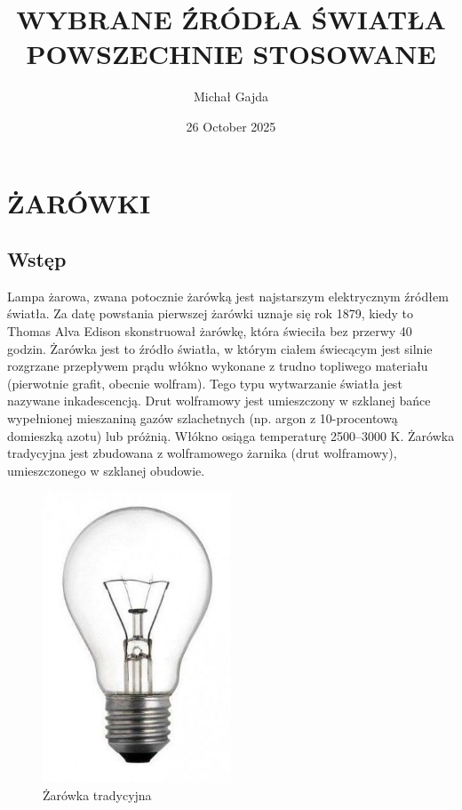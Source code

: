 \documentclass[12pt,a4paper]{book}
\title{WYBRANE ŹRÓDŁA ŚWIATŁA POWSZECHNIE STOSOWANE}
\author{Michał Gajda}
\date{26 October 2025}
\begin{document}
\maketitle

\chapter{ŻARÓWKI}

\section*{Wstęp}

Lampa żarowa, zwana potocznie żarówką jest najstarszym elektrycznym źródłem światła. Za datę powstania pierwszej żarówki uznaje się rok 1879, kiedy to Thomas Alva Edison skonstruował żarówkę, która świeciła bez przerwy 40 godzin. Żarówka jest to źródło światła, w którym ciałem świecącym jest silnie rozgrzane przepływem prądu włókno wykonane z trudno topliwego materiału (pierwotnie grafit, obecnie wolfram). Tego typu wytwarzanie światła jest nazywane inkadescencją. Drut wolframowy jest umieszczony w szklanej bańce wypełnionej mieszaniną gazów szlachetnych (np. argon z 10-procentową domieszką azotu) lub próżnią. Włókno osiąga temperaturę 2500–3000 K. Żarówka tradycyjna jest zbudowana z wolframowego żarnika (drut wolframowy), umieszczonego w szklanej obudowie. 

\begin{figure}[ht]
  \centering
  \includegraphics[width=0.5\textwidth]{Rysunek1.jpg}
  \caption{Żarówka tradycyjna}
  \label{Rys.1.1.}
\end{figure}
\end{document}
